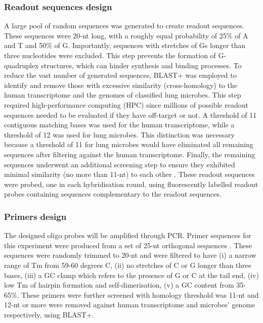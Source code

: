 \documentclass[10pt,letterpaper]{article}
\begin{document}
\subsubsection*{Readout sequences design}
A large pool of random sequences was generated to create readout sequences. These sequences were 20-nt long, with a roughly equal probability of 25\% of A and T and 50\% of G. Importantly, sequences with stretches of Gs longer than three nucleotides were excluded. This step prevents the formation of G-quadruplex structures, which can hinder synthesis and binding processes.
To reduce the vast number of generated sequences, BLAST+ was employed to identify and remove those with excessive similarity (cross-homology) to the human transcriptome and the genomes of classified lung microbes. This step required high-performance computing (HPC) since millions of possible readout sequences needed to be evaluated if they have off-target or not. A threshold of 11 contiguous matching bases was used for the human transcriptome, while a threshold of 12 was used for lung microbes. This distinction was necessary because a threshold of 11 for lung microbes would have eliminated all remaining sequences after filtering against the human transcriptome. Finally, the remaining sequences underwent an additional screening step to ensure they exhibited minimal similarity (no more than 11-nt) to each other \parencite{chen-2015}. These readout sequences were probed, one in each hybridisation round, using fluorescently labelled readout probes containing sequences complementary to the readout sequences. 

\subsubsection*{Primers design}
The designed oligo probes will be amplified through PCR. Primer sequences for this experiment were produced from a set of 25-nt orthogonal sequences \parencite{xu-2009}. These sequences were randomly trimmed to 20-nt and were filtered to have (i) a narrow range of Tm from 59-60 degrees C, (ii) no stretches of C or G longer than three bases, (iii) a GC clamp which refers to the presence of G or C at the tail end, (iv) low Tm of hairpin formation and self-dimerisation, (v) a GC content from 35-65\%. These primers were further screened with homology threshold was 11-nt and 12-nt or more were removed against human transcriptome and microbes' genome respectively, using BLAST+. 


\end{document}
